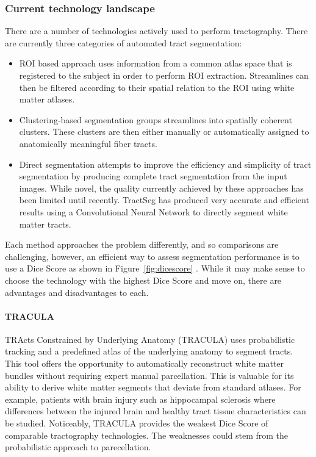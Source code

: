 \subsubsection{Current technology landscape}
There are a number of technologies actively used to perform tractography.  There 
are currently three categories of automated tract segmentation: 
\begin{itemize}
\item ROI based approach uses information from a common atlas space that is 
registered to the subject in order to perform ROI extraction.  Streamlines can 
then be filtered according to their spatial relation to the ROI using white 
matter atlases\cite {wasserman}.
\item Clustering-based segmentation groups streamlines into spatially coherent 
clusters.  These clusters are then either manually or automatically assigned to 
anatomically meaningful fiber tracts\cite {garyfallidis}.
\item Direct segmentation attempts to improve the efficiency and simplicity of 
tract segmentation by producing complete tract segmentation from the input 
images.  While novel, the quality currently achieved by these approaches has 
been limited until recently.  TractSeg has produced very accurate and efficient 
results using a Convolutional Neural Network to directly segment white matter 
tracts\cite {wasserthal}. 
\end{itemize}

Each method approaches the problem differently, and so comparisons are 
challenging, however, an efficient way to assess segmentation performance is to 
use a Dice Score\cite {taha} as shown in Figure~\ref{fig:dicescore} .  While it 
may make sense to choose the technology with the highest Dice Score and move 
on, there are advantages and disadvantages to each.


\paragraph {TRACULA}

TRActs Constrained by Underlying Anatomy (TRACULA) uses probabilistic tracking 
and a predefined atlas of the underlying anatomy to segment tracts.  This tool 
offers the opportunity to automatically reconstruct white matter bundles without 
requiring expert manual parcellation.  This is valuable for its ability to 
derive white matter segments that deviate from standard atlases.  For example, 
patients with brain injury such as hippocampal sclerosis where differences 
between the injured brain and healthy tract tissue characteristics can be 
studied\cite {kreilkamp}.  Noticeably, TRACULA provides the weakest Dice Score of 
comparable tractography technologies.  The weaknesses could stem from the 
probabilistic approach to parecellation.

